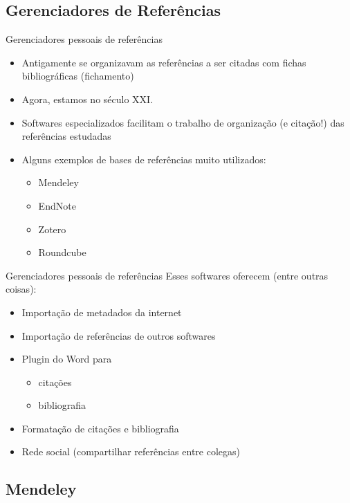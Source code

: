 \documentclass{beamer}
\begin{document}
\subsection{Gerenciadores de Referências}

\begin{frame}{Gerenciadores pessoais de referências}
  \begin{itemize}
    \footnotesize
  \item Antigamente se organizavam as referências a ser citadas com
    fichas bibliográficas (fichamento)
  \item Agora, estamos no século XXI.
  \item Softwares especializados facilitam o trabalho de organização
    (e citação!) das referências estudadas
  \item Alguns exemplos de bases de referências muito utilizados:
    \begin{itemize}
      \scriptsize
    \item \alert<2->{Mendeley}
    \item EndNote
    \item Zotero
    \item Roundcube
    \end{itemize}
  \end{itemize}
\end{frame}

\begin{frame}{Gerenciadores pessoais de referências}
  Esses softwares oferecem (entre outras coisas):
  \begin{itemize}
    \footnotesize
  \item Importação de metadados da internet
  \item Importação de referências de outros softwares
  \item Plugin do Word para
    \begin{itemize}
      \scriptsize
    \item<2-> citações
    \item<2-> bibliografia
    \end{itemize}
  \item Formatação de citações e bibliografia
  \item Rede social (compartilhar referências entre colegas)
  \end{itemize}
\end{frame}

\subsection{Mendeley}
\end{document}
